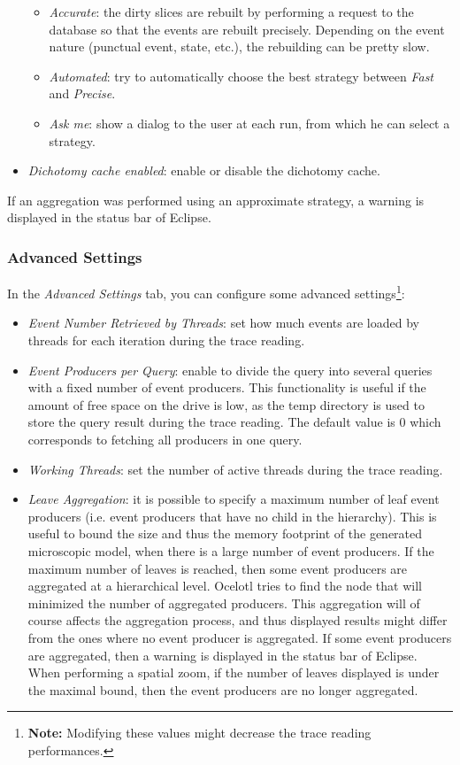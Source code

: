 \documentclass[twoside]{article}
\begin{document}
\begin{sloppypar}
\begin{itemize}
\begin{itemize}
		\item \textit{Accurate}: the dirty slices are rebuilt by performing a request to the database so that the events are rebuilt precisely. Depending on the event nature (punctual event, state, etc.), the rebuilding can be pretty slow.
		\item \textit{Automated}: try to automatically choose the best strategy between \textit{Fast} and \textit{Precise}. 
		\item \textit{Ask me}: show a dialog to the user at each run, from which he can select a strategy.
	\end{itemize}   
	\item \textit{Dichotomy cache enabled}: enable or disable the dichotomy cache.
\end{itemize} 

If an aggregation was performed using an approximate strategy, a warning is displayed in the status bar of Eclipse.

\subsubsection{Advanced Settings}
In the \textit{Advanced Settings} tab, you can configure some advanced settings\footnote{\textbf{Note:} Modifying these values might decrease the trace reading performances.}:
\begin{itemize}
	\item \textit{Event Number Retrieved by Threads}: set how much events are loaded by threads for each iteration during the trace reading.
	\item \textit{Event Producers per Query}: enable to divide the query into several queries with a fixed number of event producers. This functionality is useful if the amount of free space on the drive is low, as the temp directory is used to store the query result during the trace reading. The default value is 0 which corresponds to fetching all producers in one query.
	\item \textit{Working Threads}: set the number of active threads during the trace reading. 
	\item \textit{Leave Aggregation}: it is possible to specify a maximum number of leaf event producers (i.e. event producers that have no child in the hierarchy). This is useful to bound the size and thus the memory footprint of the generated microscopic model, when there is a large number of event producers. If the maximum number of leaves is reached, then some event producers are aggregated at a hierarchical level. Ocelotl tries to find the node that will minimized the number of aggregated producers. This aggregation will of course affects the aggregation process, and thus displayed results might differ from the ones where no event producer is aggregated. If some event producers are aggregated, then a warning is displayed in the status bar of Eclipse. When performing a spatial zoom, if the number of leaves displayed is under the maximal bound, then the event producers are no longer aggregated.
\end{itemize}


\end{sloppypar}
\end{document}
